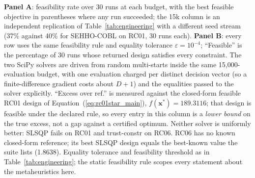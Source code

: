 \begin{table}[htbp]
\vspace{0.8em}
\begin{flushleft}\footnotesize
\textbf{Panel A}: feasibility rate over 30 runs at each budget, with the best feasible objective in parentheses where any run succeeded; the 15k column is an independent replication of Table~\ref{tab:engineering} with a different seed stream (37\% against 40\% for SEHHO-COBL on RC01, 30 runs each). \textbf{Panel B}: every row uses the same feasibility rule and equality tolerance $\varepsilon=10^{-4}$; ``Feasible'' is the percentage of 30 runs whose returned design satisfies every constraint. The two SciPy solvers are driven from random multi-starts inside the same 15{,}000-evaluation budget, with one evaluation charged per distinct decision vector (so a finite-difference gradient costs about $D+1$) and the equalities passed to the solver explicitly. ``Excess over ref.'' is measured against the closed-form feasible RC01 design of Equation~(\ref{eq:rc01star_main}), $f(\mathbf{x}^{*})=189.3116$; that design is feasible under the declared rule, so every entry in this column is a \emph{lower bound} on the true excess, not a gap against a certified optimum. Neither solver is uniformly better: SLSQP fails on RC01 and trust-constr on RC06. RC06 has no known closed-form reference; its best SLSQP design equals the best-known value the suite lists (1.8638). Equality tolerance and feasibility threshold as in Table~\ref{tab:engineering}; the static feasibility rule scopes every statement about the metaheuristics here.
\end{flushleft}
\end{table}
